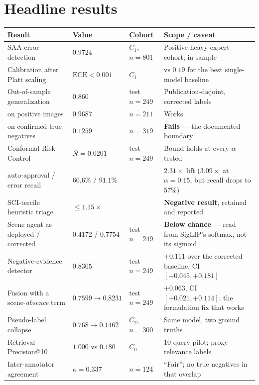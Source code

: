 \documentclass[10pt,a4paper]{article}
\begin{document}
\section{Headline results}
\begin{center}\footnotesize
\begin{tabular}{p{5.6cm} l l p{5.4cm}}
\toprule
\textbf{Result} & \textbf{Value} & \textbf{Cohort} & \textbf{Scope / caveat} \\
\midrule
SAA error detection & $0.9724$ & $C_1$, $n{=}801$ & Positive-heavy expert cohort; in-sample \\
Calibration after Platt scaling & $\text{ECE}<0.001$ & $C_1$ & vs $0.19$ for the best single-model baseline \\
Out-of-sample generalization & $0.860$ & test $n{=}249$ & Publication-disjoint, corrected labels \\
\quad on positive images & $0.9687$ & $n{=}211$ & Works \\
\quad on confirmed true negatives & $0.1259$ & $n{=}319$ & \textbf{Fails} --- the documented boundary \\
Conformal Risk Control & $\mathcal{R}=0.0201$ & test $n{=}249$ & Bound holds at every $\alpha$ tested \\
\quad auto-approval / error recall & $60.6\%$ / $91.1\%$ & & $2.31\times$ lift ($3.09\times$ at $\alpha{=}0.15$, but recall drops to $57\%$) \\
SCI-tercile heuristic triage & $\le 1.15\times$ & & \textbf{Negative result}, retained and reported \\
Scene agent as deployed / corrected & $0.4172$ / $0.7754$ & test $n{=}249$ & \textbf{Below chance} --- read from SigLIP's softmax, not its sigmoid \\
Negative-evidence detector & $\mathbf{0.8305}$ & test $n{=}249$ & $+0.111$ over the corrected baseline, CI $[+0.045,+0.181]$ \\
Fusion with a scene-\emph{absence} term & $0.7599\!\to\!\mathbf{0.8231}$ & test $n{=}249$ & $+0.063$, CI $[+0.021,+0.114]$; the formulation fix that works \\
Pseudo-label collapse & $0.768\!\to\!0.1462$ & $C_2$, $n{=}300$ & Same model, two ground truths \\
Retrieval Precision@10 & $1.000$ vs $0.180$ & $C_0$ & 10-query pilot; proxy relevance labels \\
Inter-annotator agreement & $\kappa=0.337$ & $n{=}124$ & ``Fair''; no true negatives in that overlap \\
\bottomrule
\end{tabular}
\end{center}
\end{document}

